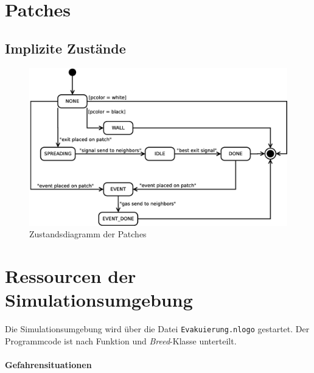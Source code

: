 \section{Patches}
\label{sec:patches}

\subsection{Implizite Zustände}





\begin{figure}
\centering
\includegraphics[height=0.6\textwidth]{simulationsumgebung/patch.eps}
\caption{Zustandsdiagramm der Patches}
\label{fig:patch}
\end{figure}

\section{Ressourcen der Simulationsumgebung}
\label{sec:ressourcen}

Die Simulationsumgebung wird über die Datei \verb|Evakuierung.nlogo| gestartet. Der Programmcode ist nach Funktion und \emph{Breed}-Klasse unterteilt.

\paragraph{Gefahrensituationen} 

